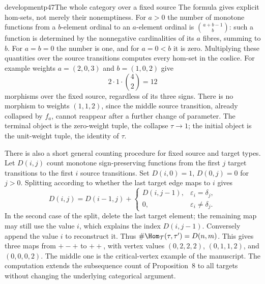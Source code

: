 \begin{dcomment}{development}{p47}{The whole category over a fixed source}
The formula gives explicit hom-sets, not merely their nonemptiness. For $a>0$ the number of monotone functions from a $b$-element ordinal to an $a$-element ordinal is $\binom{a+b-1}{b}$: such a function is determined by the nonnegative cardinalities of its $a$ fibres, summing to $b$. For $a=b=0$ the number is one, and for $a=0<b$ it is zero. Multiplying these quantities over the source transitions computes every hom-set in the coslice. For example weights $a=(2,0,3)$ and $b=(1,0,2)$ give
\[
      2\cdot1\cdot\binom{4}{2}=12
\]
morphisms over the fixed source, regardless of its three signs. There is no morphism to weights $(1,1,2)$, since the middle source transition, already collapsed by $f_a$, cannot reappear after a further change of parameter. The terminal object is the zero-weight tuple, the collapse $\tau\to1$; the initial object is the unit-weight tuple, the identity of $\tau$.

There is also a short general counting procedure for fixed source and target types. Let $D(i,j)$ count monotone sign-preserving functions from the first $j$ target transitions to the first $i$ source transitions. Set $D(i,0)=1$, $D(0,j)=0$ for $j>0$. Splitting according to whether the last target edge maps to $i$ gives
\[
 D(i,j)=D(i-1,j)+
 \begin{cases}D(i,j-1),&\varepsilon_i=\delta_j,\\0,&\varepsilon_i\ne\delta_j.
 \end{cases}                                                     \tag{B11}
\]
In the second case of the split, delete the last target element; the remaining map may still use the value $i$, which explains the index $D(i,j-1)$. Conversely append the value $i$ to reconstruct it. Thus $\#\Hom_{\mathcal T}(\tau,\tau')=D(n,m)$. This gives three maps from $+-+$ to $++$, with vertex values $(0,2,2,2)$, $(0,1,1,2)$, and $(0,0,0,2)$. The middle one is the critical-vertex example of the manuscript. The computation extends the subsequence count of Proposition~8 to all targets without changing the underlying categorical argument.
\end{dcomment}

